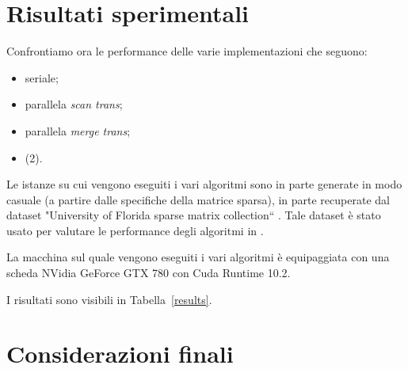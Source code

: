 

\section{Risultati sperimentali}

Confrontiamo ora le performance delle varie implementazioni che seguono:
\begin{itemize}
    \item seriale;
    \item parallela \emph{scan trans};
    \item parallela \emph{merge trans};
    \item \cuSPARSE (2).
\end{itemize}

Le istanze su cui vengono eseguiti i vari algoritmi sono in parte generate in modo casuale (a partire dalle specifiche della matrice sparsa), in parte recuperate dal dataset "University  of Florida sparse  matrix collection`` \cite{dataset}. Tale dataset è stato usato per valutare le performance degli algoritmi in \cite{parallelTrans}.

La macchina sul quale vengono eseguiti i vari algoritmi è equipaggiata con una scheda NVidia GeForce GTX 780 con Cuda Runtime 10.2.

I risultati sono visibili in Tabella~\ref{results}. 

\section{Considerazioni finali}

